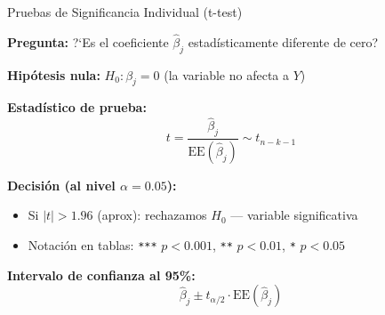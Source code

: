 \documentclass[aspectratio=169,11pt]{beamer}
\begin{document}
\begin{frame}{Pruebas de Significancia Individual (t-test)}

\textbf{Pregunta:} ?`Es el coeficiente $\hat{\beta}_j$ estad\'isticamente diferente de cero?

\vspace{0.3cm}

\small
\textbf{Hip\'otesis nula:} $H_0: \beta_j = 0$ (la variable no afecta a $Y$)

\textbf{Estad\'istico de prueba:}
\[
t = \frac{\hat{\beta}_j}{\text{EE}(\hat{\beta}_j)} \sim t_{n-k-1}
\]

\vspace{0.2cm}

\textbf{Decisi\'on (al nivel $\alpha = 0.05$):}
\begin{itemize}
    \setlength{\itemsep}{2pt}
    \item Si $|t| > 1.96$ (aprox): rechazamos $H_0$ --- variable significativa
    \item Notaci\'on en tablas: \texttt{***} $p < 0.001$, \texttt{**} $p < 0.01$, \texttt{*} $p < 0.05$
\end{itemize}

\vspace{0.2cm}

\textbf{Intervalo de confianza al 95\%:}
\[
\hat{\beta}_j \pm t_{\alpha/2} \cdot \text{EE}(\hat{\beta}_j)
\]

\end{frame}
\end{document}
